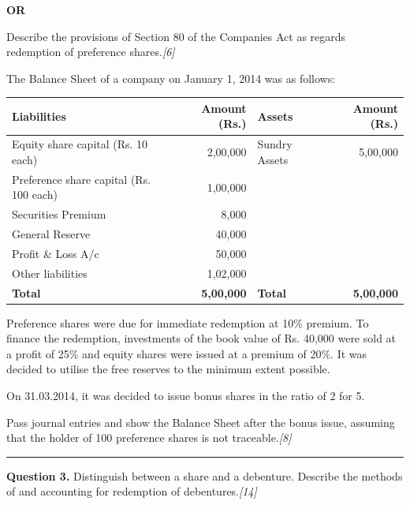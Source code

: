 \documentclass[11pt,a4paper]{article}
\newcommand{\pts}[1]{\hfill   \textit{[#1]}}
\begin{document}
\centerline{   \textbf{OR}}


\begin{parts}
  \item Describe the provisions of Section 80 of the Companies Act as regards redemption of preference shares.\pts{6}
  \item The Balance Sheet of a company on January 1, 2014 was as follows:
  
\begin{center}
    \small
    
\begin{tabular}{|l|r||l|r|}
      \hline
   \textbf{Liabilities} &   \textbf{Amount (Rs.)} &   \textbf{Assets} &   \textbf{Amount (Rs.)} \\
      \hline
      Equity share capital (Rs. 10 each) & 2,00,000 & Sundry Assets & 5,00,000 \\
      Preference share capital (Rs. 100 each) & 1,00,000 & & \\
      Securities Premium & 8,000 & & \\
      General Reserve & 40,000 & & \\
      Profit \& Loss A/c & 50,000 & & \\
      Other liabilities & 1,02,000 & & \\
      \hline
   \textbf{Total} &   \textbf{5,00,000} &   \textbf{Total} &   \textbf{5,00,000} \\
      \hline
    \end{tabular}
  \end{center}
  Preference shares were due for immediate redemption at 10\% premium. To finance the redemption, investments of the book value of Rs. 40,000 were sold at a profit of 25\% and equity shares were issued at a premium of 20\%. It was decided to utilise the free reserves to the minimum extent possible.
  
  On 31.03.2014, it was decided to issue bonus shares in the ratio of 2 for 5.
  
  Pass journal entries and show the Balance Sheet after the bonus issue, assuming that the holder of 100 preference shares is not traceable.\pts{8}
\end{parts}

\medskip\rule{\linewidth}{0.2pt}


\newpage




\noindent   \textbf{Question 3.}
Distinguish between a share and a debenture. Describe the methods of and accounting for redemption of debentures.\pts{14}
\end{document}
